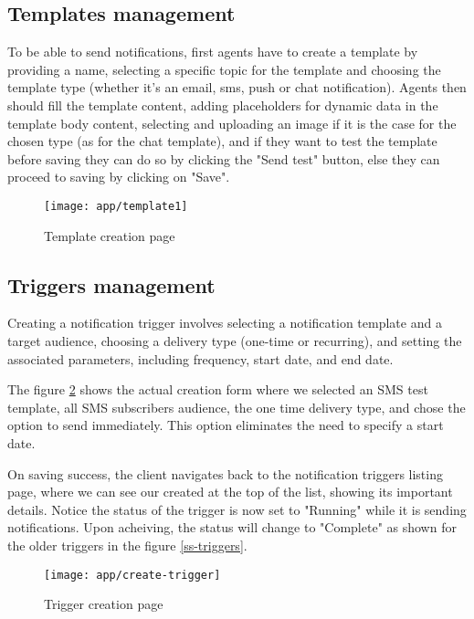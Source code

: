 \subsection{Templates management}
To be able to send notifications, first agents have to create a template by providing a name, selecting
a specific topic for the template and choosing the template type (whether it's an email, sms, push or
chat notification). Agents then should fill the template content, adding placeholders for dynamic data
in the template body content, selecting and uploading an image if it is the case for the chosen type
(as for the chat template), and if they want to test the template before saving they can do so by
clicking the "Send test" button, else they can proceed to saving by clicking on "Save".

\begin{figure}[hbt!]
    \centering
    \texttt{[image: app/template1]}
    \caption{Template creation page}
    \label{ss-template}
\end{figure}

\subsection{Triggers management}
Creating a notification trigger involves selecting a notification template and a target audience,
choosing a delivery type (one-time or recurring), and setting the associated parameters, including frequency,
start date, and end date.

The figure \ref{ss-create-trigger} shows the actual creation form where we selected an SMS test template,
all SMS subscribers audience, the one time delivery type, and chose the option to send immediately.
This option eliminates the need to specify a start date.

On saving success, the client navigates back to the notification triggers listing page, where we can
see our created at the top of the list, showing its important details. Notice the status of the trigger
is now set to "Running" while it is sending notifications. Upon acheiving, the status will change to "Complete"
as shown for the older triggers in the figure \ref{ss-triggers}.


\begin{figure}[hbt!]
    \centering
    \texttt{[image: app/create-trigger]}
    \caption{Trigger creation page}
    \label{ss-create-trigger}
\end{figure}

